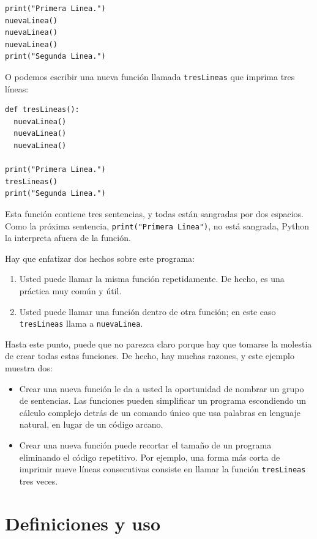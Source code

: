 \begin{lstlisting}
print("Primera Linea.")
nuevaLinea()
nuevaLinea()
nuevaLinea()
print("Segunda Linea.")
\end{lstlisting}

O podemos escribir una nueva función llamada \texttt{tresLineas} que
imprima tres líneas:

\begin{lstlisting}
def tresLineas():
  nuevaLinea()
  nuevaLinea()
  nuevaLinea()

print("Primera Linea.")
tresLineas()
print("Segunda Linea.")
\end{lstlisting}
 Esta función contiene tres sentencias, y todas están sangradas por
dos espacios. Como la próxima sentencia, \texttt{}\lstinline!print("Primera Linea")!,
no está sangrada, Python la interpreta afuera de la función.

Hay que enfatizar dos hechos sobre este programa:
\begin{enumerate}
\item Usted puede llamar la misma función repetidamente. De hecho, es una
práctica muy común y útil.
\item Usted puede llamar una función dentro de otra función; en este caso
\texttt{tresLineas} llama a \texttt{nuevaLinea}.
\end{enumerate}
Hasta este punto, puede que no parezca claro porque hay que tomarse
la molestia de crear todas estas funciones. De hecho, hay muchas razones,
y este ejemplo muestra dos:
\begin{itemize}
\item Crear una nueva función le da a usted la oportunidad de nombrar un
grupo de sentencias. Las funciones pueden simplificar un programa
escondiendo un cálculo complejo detrás de un comando único que usa
palabras en lenguaje natural, en lugar de un código arcano.
\item Crear una nueva función puede recortar el tamaño de un programa eliminando
el código repetitivo. Por ejemplo, una forma más corta de imprimir
nueve líneas consecutivas consiste en llamar la función \texttt{tresLineas}
tres veces.
\end{itemize}

\section{Definiciones y uso}

